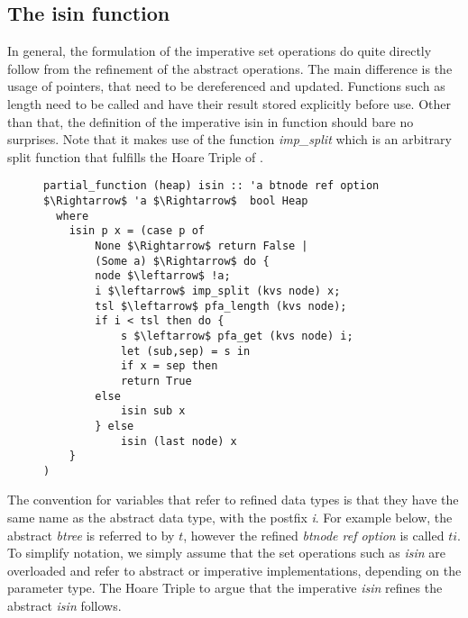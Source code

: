 
\subsection{The isin function}

In general, the formulation of the imperative set operations
do quite directly follow
from the refinement of the abstract operations.
The main difference is the usage of pointers,
that need to be dereferenced and updated.
Functions such as length need to be called and have their result
stored explicitly before use.
Other than that, the definition of the imperative isin in 
function should bare no surprises.
Note that it makes use of the function \textit{imp\_split}
which is an arbitrary split function that fulfills the Hoare Triple
of .

\begin{figure}
\begin{lstlisting}[mathescape=true, language=Isabelle, label={lst:imp-isin-fun},
    caption={The imperative isin function}]
partial_function (heap) isin :: 'a btnode ref option $\Rightarrow$ 'a $\Rightarrow$  bool Heap
  where
    isin p x = (case p of
        None $\Rightarrow$ return False |
        (Some a) $\Rightarrow$ do {
        node $\leftarrow$ !a;
        i $\leftarrow$ imp_split (kvs node) x;
        tsl $\leftarrow$ pfa_length (kvs node);
        if i < tsl then do {
            s $\leftarrow$ pfa_get (kvs node) i;
            let (sub,sep) = s in
            if x = sep then
            return True
        else
            isin sub x
        } else
            isin (last node) x
    }
)
\end{lstlisting}
\end{figure}

The convention for variables that refer to refined data types
is that they have the same name as the abstract data type,
with the postfix \textit{i}.
For example below, the abstract \textit{btree} is referred to by $t$,
however the refined \textit{btnode ref option} is called $ti$.
To simplify notation, we simply assume that the set operations
such as \textit{isin} are overloaded and refer to abstract or
imperative implementations, depending on the parameter type.
The Hoare Triple to argue that the imperative \textit{isin}
refines the abstract \textit{isin} follows.

